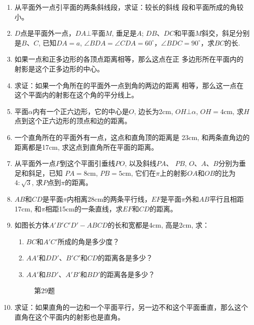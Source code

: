 \begin{enumerate}
\item 从平面外一点引平面的两条斜线段，求证：较长的斜线
段和平面所成的角较小。
\item $D$点是平面外一点，$DA\bot $平面$M$, 垂足是$A$; $DB$、$DC$和平面$M$斜交，斜足分别是$B$、$C$, 已知$DA=a$, $\angle BDA=\angle CDA=60^{\circ}$，$\angle BDC=90^{\circ}$，求$BC$的长.
\item 如果一点和正多边形的各顶点距离相等，那么这点在正
多边形所在平面内的射影是这个正多边形的中心。
\item 求证：如果一个角所在的平面外一点到角的两边的距离
相等，那么这一点在这个平面内的射影在这个角的平分线上。
\item 平面$\alpha$内有一个正六边形，它的中心是$O$, 边长为2cm,
 $OH\bot \alpha$, $OH=4$cm, 求$H$点到这个正六边形的顶点和边的距离。
\item 一个直角所在的平面外有一点，这点和直角顶的距离是
23cm, 和两条直角边的距离都是17cm, 求这点到直角所在平面的距离。
\item 从平面外一点$P$到这个平面引垂线$PO$, 以及斜线$PA$、
$PB$, $O$、$A$、$B$分别为垂足和斜足，已知 $PA=8$cm, $PB=5$cm, 它们在$\pi$上的射影$OA$和$OB$的比为$4:\sqrt{3}$, 求$P$点到$\pi$的距离。
\item $AB$和$CD$是平面$\pi$内相离28cm的两条平行线，$EF$是平面$\pi$外和$AB$平行且相距17cm, 和$\pi$相距15cm的一条直线，求$EF$和$CD$的距离。

\item 如图长方体$A'B'C'D'-ABCD$的长和宽都是4cm, 高是2cm, 求：
\begin{enumerate}
 \item $BC$和$A'C'$所成的角是多少度？
\item $AA'$和$DD'$、$B'C'$和$CD$的距离各是多少？
\item $AA'$和$BD'$、$A'B'$和$BD'$的距离各是多少？
\end{enumerate}

\begin{figure}[htp]
  \centering
{}
  \caption*{第29题}
\end{figure}


\item 求证：如果直角的一边和一个平面平行，另一边不和这个平面垂直，那么这个直角在这个平面内的射影也是直角。
\end{enumerate}


